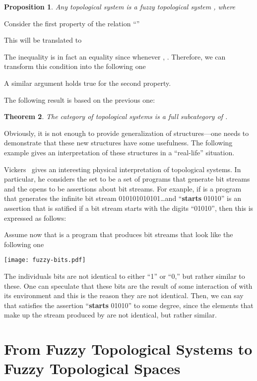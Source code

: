 \documentclass[11pt]{article}
\newtheorem{theorem}{Theorem}[section]
\newtheorem{proposition}[theorem]{Proposition}
\newenvironment{proof}[1][Proof]{\begin{trivlist}
\item[\hskip \labelsep {\bfseries #1}]}{\end{trivlist}}
\newenvironment{example}[1][Example]{\begin{trivlist}
\item[\hskip \labelsep {\bfseries #1}]}{\end{trivlist}}
\begin{document}
\begin{proposition}
Any topological system  is a fuzzy topological system , where

\end{proposition}
\begin{proof}
Consider the first property of the relation ``''

This will be translated to 

The inequality is in fact an equality since whenever , . Therefore,
we can transform this condition into the following one

A similar argument holds true for the second property.
\end{proof}
The following result is based on the previous one: 
\begin{theorem}
The category of topological systems is a full subcategory of 
.
\end{theorem}

Obviously, it is not enough to provide generalization of structures---one needs to
demonstrate that these new structures have some usefulness. The following example
gives an interpretation of these structures in a ``real-life'' situation.
\begin{example}
Vickers~\cite[p.~53]{vickers90} gives an interesting physical interpretation of 
topological systems. In particular, he considers the set  to be a set of programs 
that generate bit streams and the opens to be assertions about bit streams. For exanple, 
if  is a program that generates the infinite bit stream 010101010101\ldots and 
``\textbf{starts} 01010'' is an assertion that is satified if a bit stream starts 
with the digits ``01010'', then this is expressed as follows: 

Assume now that  is a program that produces bit streams that look like the following one
\begin{center}
\texttt{[image: fuzzy-bits.pdf]}
\end{center}
The individuals bits are not identical to either ``1'' or ``0,'' but rather similar 
to these. One can speculate that these bits are the result of some interaction of 
 with its environment and this is the reason they are not identical. Then, we can 
say that  satisfies the assertion ``\textbf{starts} 01010'' to some degree, since 
the elements that make up the stream produced by  are not identical, but rather similar.
\end{example}
\section{From Fuzzy Topological Systems to Fuzzy Topological Spaces}
\end{document}
